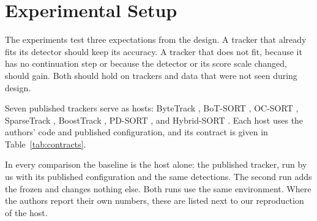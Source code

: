 \section{Experimental Setup}\label{sec:setup}

The experiments test three expectations from the design. A tracker that
already fits its detector should keep its accuracy. A tracker that does not
fit, because it has no continuation step or because the detector or its
score scale changed, should gain. Both should hold on trackers and data that
were not seen during design.

\label{sec:hosts}Seven published trackers serve as hosts: ByteTrack
\cite{zhang2022bytetrack}, BoT-SORT \cite{aharon2022botsort}, OC-SORT
\cite{cao2023ocsort}, SparseTrack \cite{liu2025sparsetrack}, BoostTrack
\cite{stanojevic2024boosttrack}, PD-SORT \cite{wang2025pdsort}, and
Hybrid-SORT \cite{yang2024hybridsort}. Each host uses the authors' code and
published configuration, and its contract is given in
Table~\ref{tab:contracts}.

In every comparison the baseline is the host alone: the published tracker,
run by us with its published configuration and the same detections. The
second run adds the frozen \scl{} and changes nothing else. Both runs use the
same environment. Where the authors report their own numbers, these are
listed next to our reproduction of the host.
